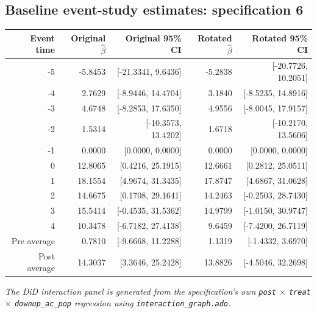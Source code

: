 \documentclass[10pt]{article}
\begin{document}
\subsection*{Baseline event-study estimates: specification 6}
\begin{center}
\scriptsize
\begin{tabular}{r rr rr}
\toprule
Event time & Original $\hat\beta$ & Original 95\% CI & Rotated $\hat\beta$ & Rotated 95\% CI \\
\midrule
-5 & -5.8453 & [-21.3341, 9.6436] & -5.2838 & [-20.7726, 10.2051] \\
-4 & 2.7629 & [-8.9446, 14.4704] & 3.1840 & [-8.5235, 14.8916] \\
-3 & 4.6748 & [-8.2853, 17.6350] & 4.9556 & [-8.0045, 17.9157] \\
-2 & 1.5314 & [-10.3573, 13.4202] & 1.6718 & [-10.2170, 13.5606] \\
-1 & 0.0000 & [0.0000, 0.0000] & 0.0000 & [0.0000, 0.0000] \\
0 & 12.8065 & [0.4216, 25.1915] & 12.6661 & [0.2812, 25.0511] \\
1 & 18.1554 & [4.9674, 31.3435] & 17.8747 & [4.6867, 31.0628] \\
2 & 14.6675 & [0.1708, 29.1641] & 14.2463 & [-0.2503, 28.7430] \\
3 & 15.5414 & [-0.4535, 31.5362] & 14.9799 & [-1.0150, 30.9747] \\
4 & 10.3478 & [-6.7182, 27.4138] & 9.6459 & [-7.4200, 26.7119] \\
\midrule
Pre average & 0.7810 & [-9.6668, 11.2288] & 1.1319 & [-1.4332, 3.6970] \\
Post average & 14.3037 & [3.3646, 25.2428] & 13.8826 & [-4.5046, 32.2698] \\
\bottomrule
\end{tabular}
\end{center}
\medskip
\textit{The DiD interaction panel is generated from the specification's own \texttt{post} $\times$ \texttt{treat} $\times$ \texttt{downup\_ac\_pop} regression using \texttt{interaction\_graph.ado}.}
\clearpage
\end{document}
